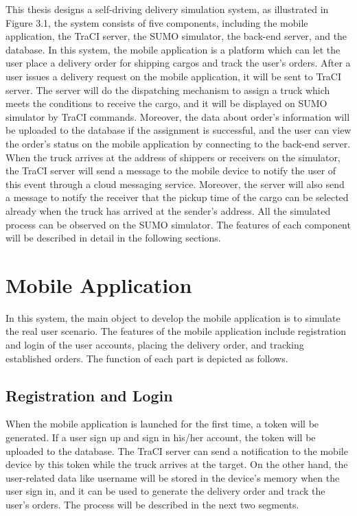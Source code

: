 \documentclass[12pt]{ksthesis}
\begin{document}
\begin{thesis}
{This thesis designs a self-driving delivery simulation system, as illustrated in Figure 3.1, the system consists of five components, including the mobile application, the TraCI server, the SUMO simulator, the back-end server, and the database. In this system, the mobile application is a platform which can let the user place a delivery order for shipping cargos and track the user’s orders. After a user issues a delivery request on the mobile application, it will be sent to TraCI server. The server will do the dispatching mechanism to assign a truck which meets the conditions to receive the cargo, and it will be displayed on SUMO simulator by TraCI commands. Moreover, the data about order’s information will be uploaded to the database if the assignment is successful, and the user can view the order’s status on the mobile application by connecting to the back-end server. When the truck arrives at the address of shippers or receivers on the simulator, the TraCI server will send a message to the mobile device to notify the user of this event through a cloud messaging service. Moreover, the server will also send a message to notify the receiver that the pickup time of the cargo can be selected already when the truck has arrived at the sender’s address. All the simulated process can be observed on the SUMO simulator. The features of each component will be described in detail in the following sections.

\section{Mobile Application}
In this system, the main object to develop the mobile application is to simulate the real user scenario. The features of the mobile application include registration and login of the user accounts, placing the delivery order, and tracking established orders. The function of each part is depicted as follows.

\subsection{Registration and Login}
When the mobile application is launched for the first time, a token will be generated. If a user sign up and sign in his/her account, the token will be uploaded to the database. The TraCI server can send a notification to the mobile device by this token while the truck arrives at the target. On the other hand, the user-related data like username will be stored in the device’s memory when the user sign in, and it can be used to generate the delivery order and track the user’s orders. The process will be described in the next two segments.

}
\end{thesis}
\end{document}
